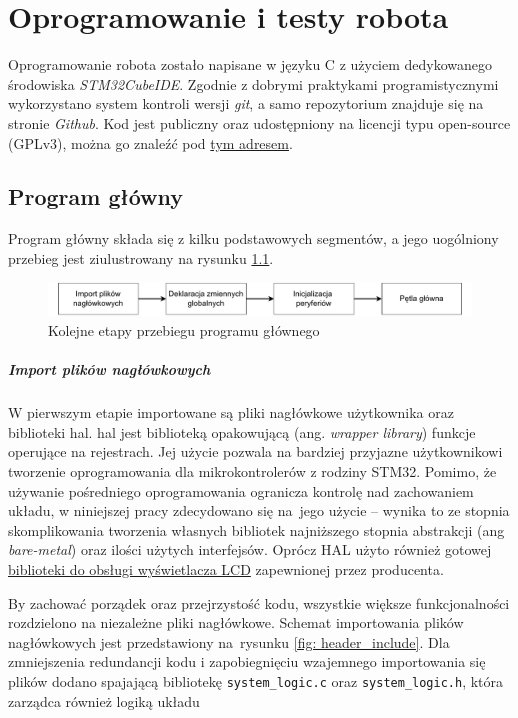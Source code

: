 \chapter{Oprogramowanie i testy robota}
Oprogramowanie robota zostało napisane w języku C z użyciem dedykowanego środowiska \textit{STM32CubeIDE}. Zgodnie z dobrymi praktykami programistycznymi wykorzystano system kontroli wersji \textit{git}, a samo repozytorium znajduje się na stronie \textit{Github}. Kod jest publiczny oraz udostępniony na licencji typu open-source (GPLv3), można go znaleźć pod \href{https://github.com/trash-hold/STM32_modular_robot.git}{tym adresem}.


\section{Program główny}
Program główny składa się z kilku podstawowych segmentów, a jego uogólniony przebieg jest ziulustrowany na rysunku \ref{fig: main_program}.
    \begin{figure}[ht!]
        \centering
        \includegraphics[width=\linewidth]{rysunki/main_program/main_program_diagram.pdf}
        \caption{Kolejne etapy przebiegu programu głównego}
        \label{fig: main_program}
    \end{figure}

\paragraph*{Import plików nagłówkowych} W pierwszym etapie importowane są pliki nagłówkowe użytkownika oraz biblioteki \gls{hal}. \gls{hal} jest biblioteką opakowującą (ang. \textit{wrapper library}) funkcje operujące na rejestrach. Jej użycie pozwala na bardziej przyjazne użytkownikowi tworzenie oprogramowania dla mikrokontrolerów z rodziny STM32. Pomimo, że używanie pośredniego oprogramowania ogranicza kontrolę nad zachowaniem układu, w niniejszej pracy zdecydowano się na~jego użycie -- wynika to ze stopnia skomplikowania tworzenia własnych bibliotek najniższego stopnia abstrakcji (ang \textit{bare-metal}) oraz ilości użytych interfejsów. Oprócz HAL użyto również gotowej \href{https://www.waveshare.com/wiki/1.8inch_LCD_Module#Software}{biblioteki do obsługi wyświetlacza LCD} zapewnionej przez producenta. 

By zachować porządek oraz przejrzystość kodu, wszystkie większe funkcjonalności rozdzielono na niezależne pliki nagłówkowe. Schemat importowania plików nagłówkowych jest przedstawiony na~rysunku \ref{fig: header_include}. Dla zmniejszenia redundancji kodu i zapobiegnięciu wzajemnego importowania się plików dodano spajającą bibliotekę \texttt{system\_logic.c} oraz \texttt{system\_logic.h}, która zarządca również logiką układu

